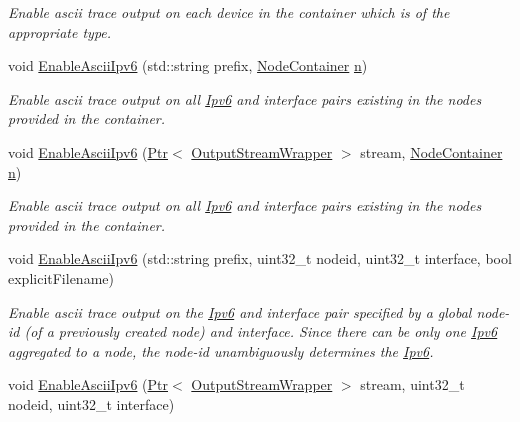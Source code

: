 \begin{DoxyCompactItemize}
\begin{DoxyCompactList}\small\item\em Enable ascii trace output on each device in the container which is of the appropriate type. \end{DoxyCompactList}\item 
void \hyperlink{classns3_1_1AsciiTraceHelperForIpv6_a60f33382e12aef242f78629f296cc4ca}{Enable\+Ascii\+Ipv6} (std\+::string prefix, \hyperlink{classns3_1_1NodeContainer}{Node\+Container} \hyperlink{lte__link__budget__x2__handover__measures_8m_abdb05bc5a064cf642a06c83b3392f148}{n})
\begin{DoxyCompactList}\small\item\em Enable ascii trace output on all \hyperlink{classns3_1_1Ipv6}{Ipv6} and interface pairs existing in the nodes provided in the container. \end{DoxyCompactList}\item 
void \hyperlink{classns3_1_1AsciiTraceHelperForIpv6_a0312e339c13062bd8490e2d958c2c222}{Enable\+Ascii\+Ipv6} (\hyperlink{classns3_1_1Ptr}{Ptr}$<$ \hyperlink{classns3_1_1OutputStreamWrapper}{Output\+Stream\+Wrapper} $>$ stream, \hyperlink{classns3_1_1NodeContainer}{Node\+Container} \hyperlink{lte__link__budget__x2__handover__measures_8m_abdb05bc5a064cf642a06c83b3392f148}{n})
\begin{DoxyCompactList}\small\item\em Enable ascii trace output on all \hyperlink{classns3_1_1Ipv6}{Ipv6} and interface pairs existing in the nodes provided in the container. \end{DoxyCompactList}\item 
void \hyperlink{classns3_1_1AsciiTraceHelperForIpv6_a2495c7a4bee689534c1f55a5fc186f35}{Enable\+Ascii\+Ipv6} (std\+::string prefix, uint32\+\_\+t nodeid, uint32\+\_\+t interface, bool explicit\+Filename)
\begin{DoxyCompactList}\small\item\em Enable ascii trace output on the \hyperlink{classns3_1_1Ipv6}{Ipv6} and interface pair specified by a global node-\/id (of a previously created node) and interface. Since there can be only one \hyperlink{classns3_1_1Ipv6}{Ipv6} aggregated to a node, the node-\/id unambiguously determines the \hyperlink{classns3_1_1Ipv6}{Ipv6}. \end{DoxyCompactList}\item 
void \hyperlink{classns3_1_1AsciiTraceHelperForIpv6_a3e3bb710df2f52b146a2fe46c3b06d0f}{Enable\+Ascii\+Ipv6} (\hyperlink{classns3_1_1Ptr}{Ptr}$<$ \hyperlink{classns3_1_1OutputStreamWrapper}{Output\+Stream\+Wrapper} $>$ stream, uint32\+\_\+t nodeid, uint32\+\_\+t interface)

\end{DoxyCompactItemize}
